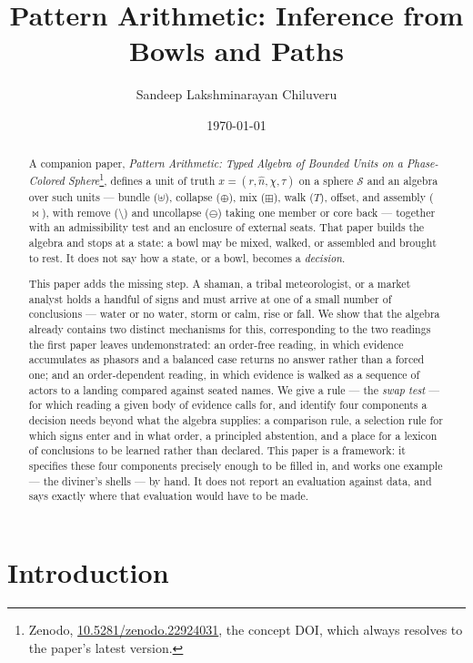 \documentclass[12pt, a4paper]{article}
\title{Pattern Arithmetic: Inference from Bowls and Paths}
\author{Sandeep Lakshminarayan Chiluveru}
\date{\today}
\begin{document}
\maketitle

\begin{abstract}
A companion paper, \emph{Pattern Arithmetic: Typed Algebra of Bounded
Units on a Phase-Colored Sphere}\footnote{Zenodo,
\href{https://doi.org/10.5281/zenodo.22924031}{10.5281/zenodo.22924031},
the concept DOI, which always resolves to the paper's latest
version.}, defines a unit of truth
$x=(r,\hat n,\chi,\tau)$ on a sphere $\mathcal{S}$ and an algebra over
such units --- bundle ($\uplus$), collapse ($\oplus$), mix ($\boxplus$), walk ($T$), offset, and assembly ($\bowtie$),
with remove ($\setminus$) and uncollapse ($\ominus$) taking one member or core back --- together with an
admissibility test and an enclosure of external seats. That paper
builds the algebra and stops at a state: a bowl may be mixed, walked,
or assembled and brought to rest. It does not say how a
state, or a bowl, becomes a \emph{decision}.

This paper adds the missing step. A shaman, a tribal meteorologist, or
a market analyst holds a handful of signs and must arrive at one of a
small number of conclusions --- water or no water, storm or calm, rise
or fall. We show that the algebra already contains two distinct
mechanisms for this, corresponding to the two readings the first paper
leaves undemonstrated: an order-free reading, in which evidence
accumulates as phasors and a balanced case returns no answer rather
than a forced one; and an order-dependent reading, in which evidence
is walked as a sequence of actors to a landing compared against
seated names. We give a rule --- the \emph{swap test} --- for which
reading a given body of evidence calls for, and identify four
components a decision needs beyond what the algebra supplies: a
comparison rule, a selection rule for which signs enter and in what
order, a principled abstention, and a place for a lexicon of
conclusions to be learned rather than declared. This paper is a
framework: it specifies these four components precisely enough to be
filled in, and works one example --- the diviner's shells --- by hand.
It does not report an evaluation against data, and says exactly where
that evaluation would have to be made.
\end{abstract}

\section{Introduction}
\label{sec:intro}
\end{document}
